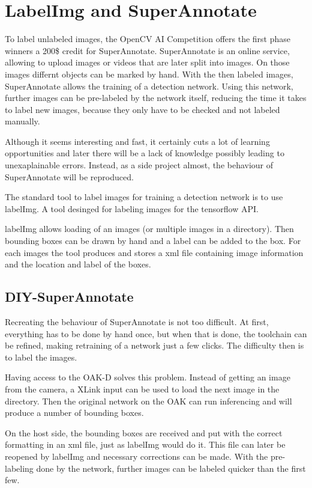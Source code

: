 \documentclass[a4paper,titlepage]{article}
\begin{document}
\newpage
\section{LabelImg and SuperAnnotate}

To label unlabeled images, the OpenCV AI Competition offers the first phase winners a 200\$ credit for SuperAnnotate.
SuperAnnotate is an online service, allowing to upload images or videos that are later split into images.
On those images differnt objects can be marked by hand.
With the then labeled images, SuperAnnotate allows the training of a detection network.
Using this network, further images can be pre-labeled by the network itself, reducing the time it takes to label new images, because they only have to be checked and not labeled manually.

Although it seems interesting and fast, it certainly cuts a lot of learning opportunities and later there will be a lack of knowledge possibly leading to unexaplainable errors.
Instead, as a side project almost, the behaviour of SuperAnnotate will be reproduced.

The standard tool to label images for training a detection network is to use labelImg.
A tool desinged for labeling images for the tensorflow API.

labelImg allows loading of an images (or multiple images in a directory).
Then bounding boxes can be drawn by hand and a label can be added to the box.
For each images the tool produces and stores a xml file containing image information and the location and label of the boxes.

\subsection{DIY-SuperAnnotate}

Recreating the behaviour of SuperAnnotate is not too difficult.
At first, everything has to be done by hand once, but when that is done, the toolchain can be refined, making retraining of a network just a few clicks.
The difficulty then is to label the images.

Having access to the OAK-D solves this problem.
Instead of getting an image from the camera, a XLink input can be used to load the next image in the directory.
Then the original network on the OAK can run inferencing and will produce a number of bounding boxes.

On the host side, the bounding boxes are received and put with the correct formatting in an xml file, just as labelImg would do it.
This file can later be reopened by labelImg and necessary corrections can be made.
With the pre-labeling done by the network, further images can be labeled quicker than the first few.
\end{document}
